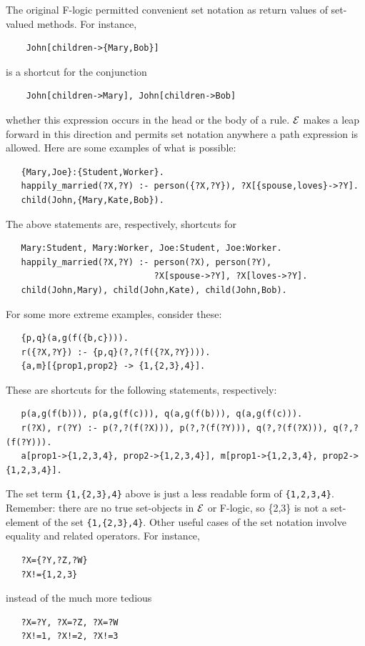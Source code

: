 \documentclass[11pt]{article}
\newcommand{\ERGO}{\mbox{\ensuremath{\cal{E}}\smaller{{\sc{RGO}}}}\xspace}
\newcommand{\FLSYSTEM}{\ERGO}
\begin{document}
The original F-logic \cite{KLW95} permitted convenient set notation as
return values of set-valued methods. For instance,
\begin{verbatim}
    John[children->{Mary,Bob}]
\end{verbatim}
is a shortcut for the conjunction
\begin{verbatim}
    John[children->Mary], John[children->Bob]
\end{verbatim}
whether this expression occurs in the head or the body of a rule. \FLSYSTEM
makes a leap forward in this direction and permits set notation anywhere a
path expression is allowed. Here are some examples of what is possible:
\begin{verbatim}
   {Mary,Joe}:{Student,Worker}.
   happily_married(?X,?Y) :- person({?X,?Y}), ?X[{spouse,loves}->?Y].
   child(John,{Mary,Kate,Bob}).
\end{verbatim}
The above statements are, respectively, shortcuts for 
\begin{verbatim}
   Mary:Student, Mary:Worker, Joe:Student, Joe:Worker.
   happily_married(?X,?Y) :- person(?X), person(?Y),
                             ?X[spouse->?Y], ?X[loves->?Y].
   child(John,Mary), child(John,Kate), child(John,Bob).
\end{verbatim}
For some more extreme examples, consider these:
\begin{verbatim}
   {p,q}(a,g(f({b,c}))).
   r({?X,?Y}) :- {p,q}(?,?(f({?X,?Y}))).
   {a,m}[{prop1,prop2} -> {1,{2,3},4}].
\end{verbatim}
These are shortcuts for the following statements, respectively:
\begin{verbatim}
   p(a,g(f(b))), p(a,g(f(c))), q(a,g(f(b))), q(a,g(f(c))).
   r(?X), r(?Y) :- p(?,?(f(?X))), p(?,?(f(?Y))), q(?,?(f(?X))), q(?,?(f(?Y))).
   a[prop1->{1,2,3,4}, prop2->{1,2,3,4}], m[prop1->{1,2,3,4}, prop2->{1,2,3,4}].
\end{verbatim}
The set term \texttt{\{1,\{2,3\},4\}} above is just a less readable form of
\texttt{\{1,2,3,4\}}. Remember: there are no true set-objects in
\FLSYSTEM or F-logic, so \{2,3\} is not a set-element of the set
\texttt{\{1,\{2,3\},4\}}.
Other useful cases of the set notation involve equality and related
operators. For instance,
\begin{verbatim}
   ?X={?Y,?Z,?W}
   ?X!={1,2,3}
\end{verbatim}
instead of the much more tedious
\begin{verbatim}
   ?X=?Y, ?X=?Z, ?X=?W
   ?X!=1, ?X!=2, ?X!=3
\end{verbatim}
\end{document}
